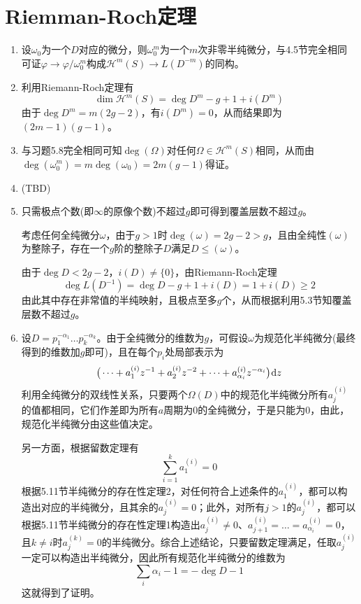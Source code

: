 \documentclass[a4paper,UTF8,fontset=windows,10pt]{ctexart}
\newcommand*{\dr}{\hspace{0.07em}\mathrm{d}}
\begin{document}
\section{Riemman-Roch定理}
\begin{enumerate}
    \item 设$\omega_0$为一个$D$对应的微分，则$\omega_0^m$为一个$m$次非零半纯微分，与4.5节完全相同可证$\varphi\to\varphi/\omega_0^m$构成$\mathscr{H}^m(S)\to L(D^{-m})$的同构。
    
    \item 利用Riemann-Roch定理有
    $$\dim\mathscr{H}^m(S)=\deg D^m-g+1+i(D^m)$$
    由于$\deg D^m=m(2g-2)$，有$i(D^m)=0$，从而结果即为$(2m-1)(g-1)$。

    \item 与习题5.8完全相同可知$\deg(\Omega)$对任何$\Omega\in\mathscr{H}^m(S)$相同，从而由$\deg(\omega_0^m)=m\deg(\omega_0)=2m(g-1)$得证。
    
    \item (TBD)

    \item 只需极点个数(即$\infty$的原像个数)不超过$g$即可得到覆盖层数不超过$g$。
    
    考虑任何全纯微分$\omega$，由于$g>1$时$\deg(\omega)=2g-2>g$，且由全纯性$(\omega)$为整除子，存在一个$g$阶的整除子$D$满足$D\le(\omega)$。

    由于$\deg D<2g-2$，$i(D)\ne\{0\}$，由Riemann-Roch定理
    $$\deg L(D^{-1})=\deg D-g+1+i(D)=1+i(D)\ge2$$
    由此其中存在非常值的半纯映射，且极点至多$g$个，从而根据利用5.3节知覆盖层数不超过$g$。

    \item 
    设$D=p_1^{-\alpha_1}\dots p_k^{-\alpha_k}$。由于全纯微分的维数为$g$，可假设$\omega$为规范化半纯微分(最终得到的维数加$g$即可)，且在每个$p_i$处局部表示为
    $$\big(\dots+a_1^{(i)}z^{-1}+a_2^{(i)}z^{-2}+\dots+a_{\alpha_i}^{(i)}z^{-\alpha_i}\big)\dr z$$
    利用全纯微分的双线性关系，只要两个$\Omega(D)$中的规范化半纯微分所有$a_j^{(i)}$的值都相同，它们作差即为所有$a$周期为0的全纯微分，于是只能为0，由此，规范化半纯微分由这些值决定。

    另一方面，根据留数定理有
    $$\sum_{i=1}^ka_1^{(i)}=0$$
    根据5.11节半纯微分的存在性定理2，对任何符合上述条件的$a_1^{(i)}$，都可以构造出对应的半纯微分，且其余的$a_j^{(i)}=0$；此外，对所有$j>1$的$a_j^{(i)}$，都可以根据5.11节半纯微分的存在性定理1构造出$a_j^{(i)}\ne0$、$a_{j+1}^{(i)}=\dots=a_{\alpha_i}^{(i)}=0$，且$k\ne i$时$a_j^{(k)}=0$的半纯微分。综合上述结论，只要留数定理满足，任取$a_j^{(i)}$一定可以构造出半纯微分，因此所有规范化半纯微分的维数为
    $$\sum_i\alpha_i-1=-\deg D-1$$
    这就得到了证明。


\end{enumerate}
\end{document}
